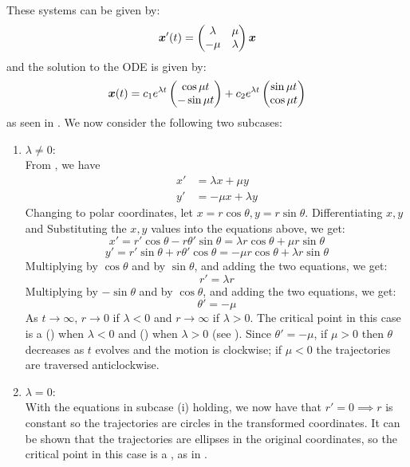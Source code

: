 \begin{itemize}
	These systems can be given by:
	\begin{equation}\label{3.6}
		\bm{x}'(t) = \begin{pmatrix} \lambda & \mu \\ -\mu & \lambda\end{pmatrix} \bm{x}
	\end{equation} 
	and the solution to the ODE is given by:
	\[
	\bm{x}(t) = c_1 e^{\lambda t} \begin{pmatrix}\cos{\mu t} \\ -\sin{\mu t}\end{pmatrix} + c_2 e^{\lambda t} \begin{pmatrix}\sin{\mu t} \\ \cos{\mu t}\end{pmatrix} 
	\]
	as seen in . We now consider the following two subcases: 
	\begin{enumerate}[label=(\roman*)]
		\item $\lambda \neq 0$: \\ 
		From , we have 
		\begin{align*}
			x' &= \lambda x + \mu y \\
			y' &= -\mu x + \lambda y
		\end{align*}
		Changing to polar coordinates, let $x= r \cos{\theta}, y = r \sin{\theta}$. Differentiating $x,y$ and Substituting the $x,y$ values into the equations above, we get: 
		\begin{equation}\label{eq3.7}
			x' = r'\cos{\theta} - r\theta'\sin{\theta} = \lambda r \cos{\theta} + \mu r\sin{\theta}
		\end{equation}
		\begin{equation}\label{eq3.8}
			y' = r'\sin{\theta} + r\theta'\cos{\theta} = -\mu r \cos{\theta} + \lambda r\sin{\theta}
		\end{equation}
		Multiplying  by $\cos{\theta}$ and  by $\sin{\theta}$, and adding the two equations, we get: 
		\[
		r' = \lambda r
		\]
		Multiplying  by $-\sin{\theta}$ and  by $\cos{\theta}$, and adding the two equations, we get: 
		\[
		\theta' = -\mu
		\]
		As $t \to \infty$, $r \to 0$ if $\lambda<0$ and $r \to \infty$ if $\lambda>0$. 
		The critical point in this case is a  () when $\lambda<0$ and  () when $\lambda>0$ (see ). Since $\theta' = -\mu$, if $\mu>0$ then $\theta$ decreases as $t$ evolves and the motion is clockwise; if $\mu<0$ the trajectories are traversed anticlockwise.
		
		\item $\lambda = 0$: \\
		With the equations in subcase (i) holding, we now have that $r'=0 \implies r$ is constant so the trajectories are circles in the transformed coordinates. It can be shown that the trajectories are ellipses in the original coordinates, so the critical point in this case is a , as in .
	\end{enumerate}
	

\end{itemize}
